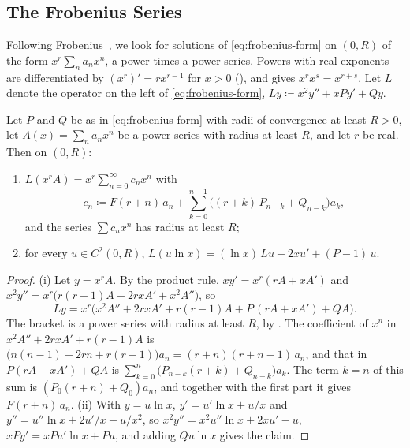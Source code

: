 \subsection{The Frobenius Series}

Following Frobenius~\cite{frobenius1873}, we look for solutions of \eqref{eq:frobenius-form} on $(0,R)$ of the form $x^r\sum_na_nx^n$, a power times a power series. Powers with real exponents are differentiated by $(x^r)'=rx^{r-1}$ for $x>0$ (), and  gives $x^rx^s=x^{r+s}$. Let $L$ denote the operator on the left of \eqref{eq:frobenius-form}, $Ly\coloneqq x^2y''+xPy'+Qy$.

\begin{lemma}
\label{lem:frobenius-substitution}
Let $P$ and $Q$ be as in \eqref{eq:frobenius-form} with radii of convergence at least $R>0$, let $A(x)=\sum_na_nx^n$ be a power series with radius at least $R$, and let $r$ be real. Then on $(0,R)$:
\begin{enumerate}
\item $L(x^rA)=x^r\sum_{n=0}^\infty c_nx^n$ with
\[
c_n\coloneqq F(r+n)\,a_n+\sum_{k=0}^{n-1}\bigl((r+k)\,P_{n-k}+Q_{n-k}\bigr)a_k ,
\]
and the series $\sum c_nx^n$ has radius at least $R$;
\item for every $u\in C^2(0,R)$, $L(u\ln x)=(\ln x)\,Lu+2xu'+(P-1)\,u$.
\end{enumerate}
\end{lemma}

\begin{proof}
(i) Let $y=x^rA$. By the product rule, $xy'=x^r(rA+xA')$ and $x^2y''=x^r\bigl(r(r-1)A+2rxA'+x^2A''\bigr)$, so
\[
Ly=x^r\bigl(x^2A''+2rxA'+r(r-1)A+P\,(rA+xA')+QA\bigr).
\]
The bracket is a power series with radius at least $R$, by . The coefficient of $x^n$ in $x^2A''+2rxA'+r(r-1)A$ is $\bigl(n(n-1)+2rn+r(r-1)\bigr)a_n=(r+n)(r+n-1)\,a_n$, and that in $P(rA+xA')+QA$ is $\sum_{k=0}^n\bigl(P_{n-k}(r+k)+Q_{n-k}\bigr)a_k$. The term $k=n$ of this sum is $(P_0(r+n)+Q_0)a_n$, and together with the first part it gives $F(r+n)\,a_n$. (ii) With $y=u\ln x$, $y'=u'\ln x+u/x$ and $y''=u''\ln x+2u'/x-u/x^2$, so $x^2y''=x^2u''\ln x+2xu'-u$, $xPy'=xPu'\ln x+Pu$, and adding $Qu\ln x$ gives the claim.
\end{proof}

